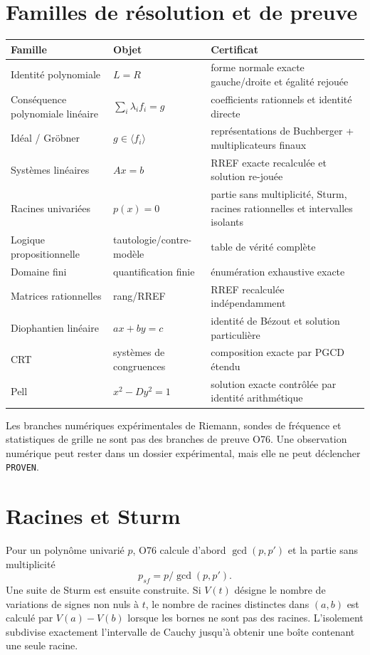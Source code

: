 \documentclass[11pt,a4paper]{article}
\newcommand{\Prov}{\texttt{PROVEN}}
\begin{document}
\section{Familles de résolution et de preuve}
\begin{longtable}{p{}p{}p{}}
\toprule
Famille & Objet & Certificat\\
\midrule
Identité polynomiale & $L=R$ & forme normale exacte gauche/droite et égalité rejouée\\
Conséquence polynomiale linéaire & $\sum_i\lambda_i f_i=g$ & coefficients rationnels et identité directe\\
Idéal / Gröbner & $g\in\langle f_i\rangle$ & représentations de Buchberger + multiplicateurs finaux\\
Systèmes linéaires & $Ax=b$ & RREF exacte recalculée et solution re-jouée\\
Racines univariées & $p(x)=0$ & partie sans multiplicité, Sturm, racines rationnelles et intervalles isolants\\
Logique propositionnelle & tautologie/contre-modèle & table de vérité complète\\
Domaine fini & quantification finie & énumération exhaustive exacte\\
Matrices rationnelles & rang/RREF & RREF recalculée indépendamment\\
Diophantien linéaire & $ax+by=c$ & identité de Bézout et solution particulière\\
CRT & systèmes de congruences & composition exacte par PGCD étendu\\
Pell & $x^2-Dy^2=1$ & solution exacte contrôlée par identité arithmétique\\
\bottomrule\end{longtable}

Les branches numériques expérimentales de Riemann, sondes de fréquence et statistiques de grille ne sont pas des branches de preuve O76. Une observation numérique peut rester dans un dossier expérimental, mais elle ne peut déclencher \Prov.

\section{Racines et Sturm}
Pour un polynôme univarié $p$, O76 calcule d'abord $\gcd(p,p')$ et la partie sans multiplicité
\[
p_{sf}=p/\gcd(p,p').
\]
Une suite de Sturm est ensuite construite. Si $V(t)$ désigne le nombre de variations de signes non nuls à $t$, le nombre de racines distinctes dans $(a,b)$ est calculé par $V(a)-V(b)$ lorsque les bornes ne sont pas des racines. L'isolement subdivise exactement l'intervalle de Cauchy jusqu'à obtenir une boîte contenant une seule racine.
\end{document}
